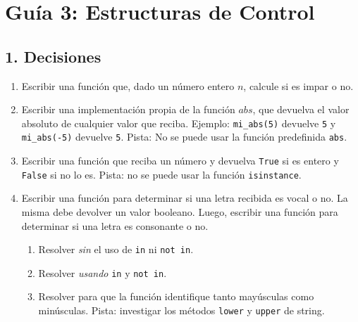 \documentclass[
  letterpaper,
  DIV=11,
  numbers=noendperiod]{scrreprt}
\providecommand{\tightlist}{%
  \setlength{\itemsep}{0pt}\setlength{\parskip}{0pt}}\usepackage{longtable,booktabs,array}
\begin{document}
\section*{Guía 3: Estructuras de
Control}\label{guuxeda-3-estructuras-de-control}


\subsection*{1. Decisiones}\label{decisiones-1}

\begin{enumerate}
\def\labelenumi{\arabic{enumi}.}
\item
  Escribir una función que, dado un número entero \(n\), calcule si es
  impar o no.
\item
  Escribir una implementación propia de la función \(abs\), que devuelva
  el valor absoluto de cualquier valor que reciba. Ejemplo:
  \texttt{mi\_abs(5)} devuelve \texttt{5} y \texttt{mi\_abs(-5)}
  devuelve \texttt{5}. Pista: No se puede usar la función predefinida
  \texttt{abs}.
\item
  Escribir una función que reciba un número y devuelva \texttt{True} si
  es entero y \texttt{False} si no lo es. Pista: no se puede usar la
  función \texttt{isinstance}.
\item
  Escribir una función para determinar si una letra recibida es vocal o
  no. La misma debe devolver un valor booleano. Luego, escribir una
  función para determinar si una letra es consonante o no.

  \begin{enumerate}
  \def\labelenumii{\alph{enumii}.}
  \tightlist
  \item
    Resolver \emph{sin} el uso de \texttt{in} ni \texttt{not\ in}.
  \item
    Resolver \emph{usando} \texttt{in} y \texttt{not\ in}.
  \item
    Resolver para que la función identifique tanto mayúsculas como
    minúsculas. Pista: investigar los métodos \texttt{lower} y
    \texttt{upper} de string.
  \end{enumerate}
\end{enumerate}
\end{document}

